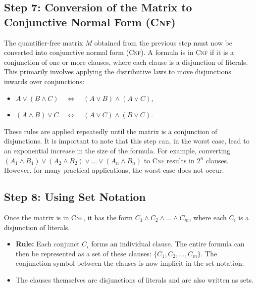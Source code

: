 \subsection{Step 7: Conversion of the Matrix to Conjunctive Normal Form (\textsc{Cnf})}

The quantifier-free matrix $M$ obtained from the previous step must now be converted into conjunctive normal form (\textsc{Cnf}). A formula is in \textsc{Cnf} if it is a conjunction of one or more clauses, where each clause is a disjunction of literals. This primarily involves applying the distributive laws to move disjunctions inwards over conjunctions:
\begin{itemize}
\item $A \lor (B \land C) \quad\Leftrightarrow\quad (A \lor B) \land (A \lor C)$,
\item $(A \land B) \lor C \quad\Leftrightarrow\quad (A \lor C) \land (B \lor C)$.
\end{itemize}
These rules are applied repeatedly until the matrix is a conjunction of disjunctions. It is important to note
that this step can, in the worst case, lead to an exponential increase in the size of the formula. For example,
converting $(A_1 \land B_1) \lor (A_2 \land B_2) \lor \dots \lor (A_n \land B_n)$ to \textsc{Cnf} results in
$2^n$ clauses. However, for many practical applications, the worst case does not occur. 


\subsection{Step 8: Using Set Notation}
Once the matrix is in \textsc{Cnf}, it has the form $C_1 \land C_2 \land \dots \land C_m$, where each $C_i$ is a disjunction of literals.
\begin{itemize}
\item \textbf{Rule:} Each conjunct $C_i$ forms an individual clause. The entire formula can then be
      represented as a set of these clauses: $\{C_1, C_2, \dots, C_m\}$. The conjunction symbol between the
      clauses is now implicit in the set notation.
\item The clauses themselves are disjunctions of literals and are also written as sets.
\end{itemize}

